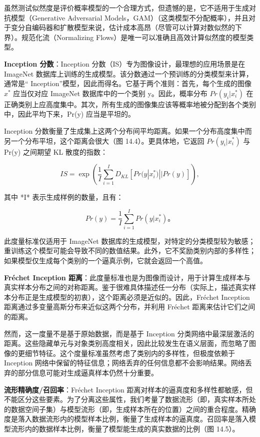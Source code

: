 虽然测试似然度是评价概率模型的一个合理方式，但遗憾的是，它不适用于生成对抗模型（Generative Adversarial Models，GAM）（这类模型不分配概率），并且对于变分自编码器和扩散模型来说，估计成本高昂（尽管可以计算对数似然的下界）。规范化流（Normalizing Flows）是唯一可以准确且高效计算似然度的模型类型。

\textbf{Inception 分数}：Inception 分数（IS）专为图像设计，最理想的应用场景是在 ImageNet 数据库上训练的生成模型。该分数通过一个预训练的分类模型来计算，通常是“ Inception”模型，因此而得名。它基于两个准则：首先，每个生成的图像 \(x^*\) 应当仅对应 ImageNet 数据库中的一个类别 y。因此，概率分布 \(Pr(y_i|x^*_i)\) 在正确类别上应高度集中。其次，所有生成的图像集应该等概率地被分配到各个类别中，因此平均下来，Pr(y) 应当是平坦的。

Inception 分数衡量了生成集上这两个分布间平均距离。如果一个分布高度集中而另一个分布平坦，这个距离会很大（图 14.4）。更具体地，它返回 \(Pr(y_i|x^*_i)\) 与 Pr(y) 之间期望 KL 散度的指数：

\begin{equation}
IS = \exp \left( \frac{1}{I} \sum_{i=1}^{I} D_{KL} [ Pr(y|x_i^*) || Pr(y) ] \right),
\end{equation}

其中 *I* 表示生成样例的数量，且有：

\begin{equation}
Pr(y) = \frac{1}{I} \sum_{i=1}^{I} Pr(y|x_i^*)。
\end{equation}

此度量标准仅适用于 ImageNet 数据库的生成模型，对特定的分类模型较为敏感；重训练这个模型可能会导致不同的数值结果。此外，它不奖励类别内部的多样性；如果模型仅生成每个类别的一个逼真示例，它就会返回一个高值。

\textbf{Fréchet Inception 距离}：此度量标准也是为图像而设计，用于计算生成样本与真实样本分布之间的对称距离。鉴于很难具体描述任一分布（实际上，描述真实样本分布正是生成模型的初衷），这个距离必须是近似的。因此，Fréchet Inception 距离通过多变量高斯分布来近似这两个分布，并利用 Fréchet 距离来估计它们之间的距离。

然而，这一度量不是基于原始数据，而是基于 Inception 分类网络中最深层激活的距离。这些隐藏单元与对象类别高度相关，因此比较发生在语义层面，而忽略了图像的更细节特征。这个度量标准虽然考虑了类别内的多样性，但极度依赖于 Inception 网络中保留的特征信息；网络丢弃的任何信息都不会影响结果。网络丢弃的部分信息可能对生成逼真样本仍然十分重要。

\textbf{流形精确度/召回率}：Fréchet Inception 距离对样本的逼真度和多样性都敏感，但不能区分这些要素。为了分离这些属性，我们考量了数据流形（即，真实样本所处的数据空间子集）与模型流形（即，生成样本所在的位置）之间的重合程度。精确度是落入数据流形内的模型样本比例，衡量了生成样本的逼真度。召回率是落入模型流形内的数据样本比例，衡量了模型能生成的真实数据的比例（图 14.5）。

